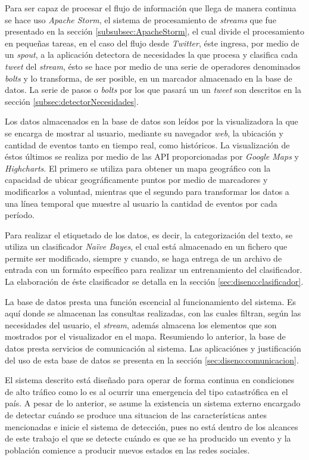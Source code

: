Para ser capaz de procesar el flujo de información que llega de manera continua se hace uso \textit{Apache Storm}, el sistema de procesamiento de \textit{streams} que fue presentado en la sección \ref{subsubsec:ApacheStorm}, el cual divide el procesamiento en pequeñas tareas, en el caso del flujo desde \textit{Twitter}, éste ingresa, por medio de un \textit{spout}, a la aplicación detectora de necesidades la que procesa y clasifica cada \textit{tweet} del \textit{stream}, ésto se hace por medio de una serie de operadores denominados \textit{bolts} y lo transforma, de ser posible, en un marcador almacenado en la base de datos. La serie de pasos o \textit{bolts} por los que pasará un un \textit{tweet} son descritos en la sección \ref{subsec:detectorNecesidades}.

Los datos almacenados en la base de datos son leídos por la visualizadora la que se encarga de mostrar al usuario, mediante su navegador \textit{web}, la ubicación y cantidad de eventos tanto en tiempo real, como históricos. La visualización de éstos últimos se realiza por medio de las API proporcionadas por \textit{Google Maps} y \textit{Highcharts}. El primero se utiliza para obtener un mapa geográfico con la capacidad de ubicar geográficamente puntos por medio de marcadores y modificarlos a voluntad, mientras que el segundo para transformar los datos a una línea temporal que muestre al usuario la cantidad de eventos por cada período.

Para realizar el etiquetado de los datos, es decir, la categorización del texto, se utiliza un clasificador \textit{Naïve Bayes}, el cual está almacenado en un fichero que permite ser modificado, siempre y cuando, se haga entrega de un archivo de entrada con un formáto específico para realizar un entrenamiento del clasificador. La elaboración de éste clasificador se detalla en la sección \ref{sec:diseno:clasificador}.

La base de datos presta una función escencial al funcionamiento del sistema. Es aquí donde se almacenan las consultas realizadas, con las cuales filtran, según las necesidades del usuario, el \textit{stream}, además almacena los elementos que son mostrados por el visualizador en el mapa. Resumiendo lo anterior, la base de datos presta servicios de comunicación al sistema. Las aplicaciónes y justificación del uso de esta base de datos se presenta en la sección \ref{sec:diseno:comunicacion}.

El sistema descrito está diseñado para operar de forma continua en condiciones de alto tráfico como lo es al ocurrir una emergencia del tipo catastrófica en el país. A pesar de lo anterior, se asume la existencia un sistema externo encargado de detectar cuándo se produce una situacion de las características antes mencionadas e inicie el sistema de detección, pues no está dentro de los alcances de este trabajo el que se detecte cuándo es que se ha producido un evento y la población comience a producir nuevos estados en las redes sociales.

